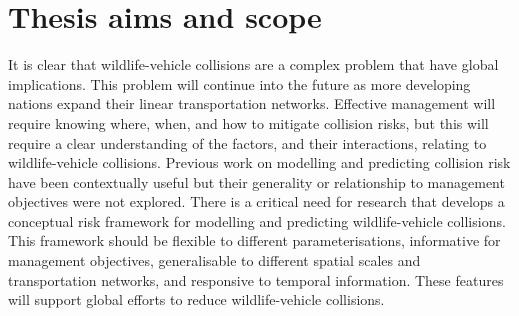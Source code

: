 

\section{Thesis aims and scope}

It is clear that wildlife-vehicle collisions are a complex problem that have global implications. This problem will continue into the future as more developing nations expand their linear transportation networks. Effective management will require knowing where, when, and how to mitigate collision risks, but this will require a clear understanding of the factors, and their interactions, relating to wildlife-vehicle collisions. Previous work on modelling and predicting collision risk have been contextually useful but their generality or relationship to management objectives were not explored. There is a critical need for research that develops a conceptual risk framework for modelling and predicting wildlife-vehicle collisions. This framework should be flexible to different parameterisations, informative for management objectives, generalisable to different spatial scales and transportation networks, and responsive to temporal information. These features will support global efforts to reduce wildlife-vehicle collisions.

